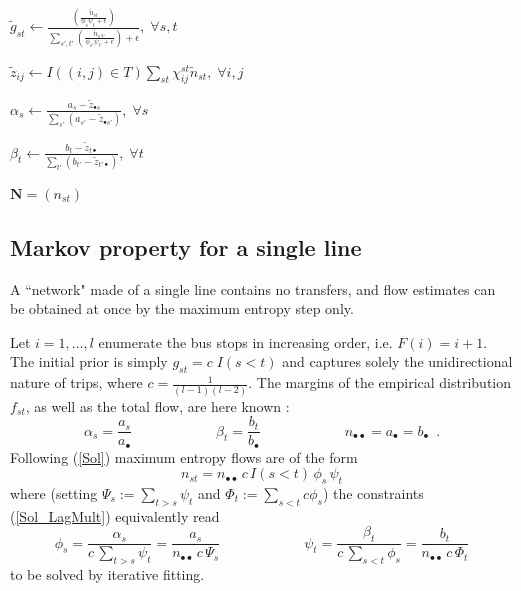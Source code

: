 \documentclass{bmcart}
\begin{document}
\begin{algorithm}[h]
\begin{algorithmic}[1]
		\State $\widetilde{g}_{st} \leftarrow \frac{\left( \frac{\widetilde{n}_{st}}{\phi_s \psi_t + \epsilon} \right)}{\sum_{s',t'} \left( \frac{\widetilde{n}_{s't'}}{\phi_{s'} \psi_{t'} + \epsilon} \right) + \epsilon}, \; \forall s,t$ 
		
		\State $\widetilde{z}_{ij} \leftarrow I((i,j) \in T)\sum_{st} \chi_{ij}^{st} \widetilde{n}_{st}, \; \forall i,j$
		
		\State $\alpha_s \leftarrow \frac{a_s - \widetilde{z}_{\bullet s}}{\sum_{s'}(a_{s'} - \widetilde{z}_{\bullet {s'}})}, \; \forall s$ 
		
		\State $\beta_t \leftarrow \frac{b_t - \widetilde{z}_{t \bullet}}{\sum_{t'} (b_{t'} - \widetilde{z}_{{t'} \bullet})}, \; \forall t$ 
		
		\EndWhile
		\State \Return $\mathbf{N} = (n_{st})$
	\end{algorithmic}
\end{algorithm}


\subsection{Markov property for a single line}
\label{Single line}
A ``network" made of a single line contains no transfers, and flow estimates can be obtained at once by the maximum entropy step only.


Let  $i=1,\ldots, l$ enumerate the bus stops in increasing order,  i.e. $F(i)=i+1$. The initial prior is simply $g_{st}=c\; I(s<t)$ and captures solely the unidirectional nature of trips, where $c=\frac{1}{(l-1)(l-2)}$.   The margins of the empirical distribution $f_{st}$, as well as the total flow, are here known : 
\begin{displaymath}
\alpha_s=\frac{a_s}{a_\bullet}\qquad\qquad\qquad \beta_t=\frac{b_t}{b_\bullet}\qquad\qquad\qquad n_{\bullet\bullet}=a_{\bullet}=b_\bullet\enspace. 
\end{displaymath}
Following  (\ref{Sol}) maximum entropy flows are of the form
\begin{equation}
\label{nosignle}
n_{st}= n_{\bullet\bullet}\,  c\, I(s<t)\, \phi_s\,  \psi_t 
\end{equation}
where (setting $\Psi_s:=\sum_{t>s}\psi_t$ and $\Phi_t:=\sum_{s<t}c\phi_s$) the constraints (\ref{Sol_LagMult}) equivalently read
\begin{equation}
\label{dis embarking constraints}
\phi_s=\frac{\alpha_s}{c\, \sum_{t>s}\psi_t}=\frac{a_s}{n_{\bullet\bullet}\,  c\, \Psi_s}
\qquad\qquad\qquad
\psi_t=\frac{\beta_t}{c\, \sum_{s<t}\phi_s}=\frac{b_t}{n_{\bullet\bullet}\, c\, \Phi_t}
\end{equation}
to be solved by iterative fitting. 
\end{document}
